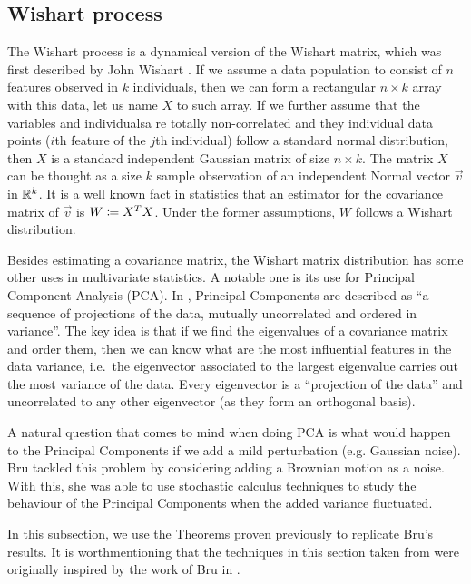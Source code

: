 \subsection{Wishart process}


The Wishart process is a dynamical version of the Wishart matrix, which was first described by John Wishart \cite{article:wishart}. If we assume a data population to consist of $n$ features observed in $k$ individuals, then we can form a rectangular $n\times k$ array with this data, let us name $X$ to such array. If we further assume that the variables and individualsa re totally non-correlated and they individual data points ($i$th feature of the $j$th individual) follow a standard normal distribution, then $X$ is a standard independent Gaussian matrix of size $n\times k$. The matrix $X$ can be thought as a size $k$ sample observation of an independent Normal vector $\vec v$ in $\mathbb R^k$. It is a well known fact in statistics that an estimator for the covariance matrix of $\vec v$ is $W \coloneqq X^TX$. Under the former assumptions, $W$ follows a Wishart distribution.

Besides estimating a covariance matrix, the Wishart matrix distribution has some other uses in multivariate statistics. A notable one is its use for Principal Component Analysis (PCA). In \cite{book:hastie_tibshirani}, Principal Components are described as ``a sequence of projections of the data, mutually uncorrelated and ordered in variance''. The key idea is that if we find the eigenvalues of a covariance matrix and order them, then we can know what are the most influential features in the data variance, i.e.\ the eigenvector associated to the largest eigenvalue carries out the most variance of the data. Every eigenvector is a ``projection of the data'' and uncorrelated to any other eigenvector (as they form an orthogonal basis). 

A natural question that comes to mind when doing PCA is what would happen to the Principal Components if we add a mild perturbation (e.g. Gaussian noise). Bru \cite{bru1989diffusions} tackled this problem by considering adding a Brownian motion as a noise. With this, she was able to use stochastic calculus techniques to study the behaviour of the Principal Components when the added variance fluctuated. 


In this subsection, we use the Theorems proven previously to replicate Bru's results. It is worthmentioning that the techniques in this section taken from \cite{article:multiyamada} were originally inspired by the work of Bru in \cite{bru1989diffusions}.


